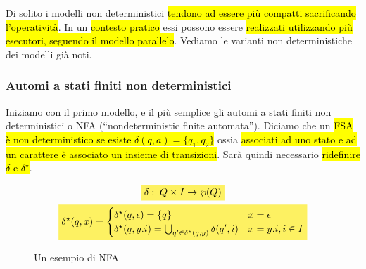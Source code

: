 \documentclass[a4paper,11pt,oneside]{article}
\theoremstyle{plain}
\theoremstyle{definition}
\theoremstyle{remark}
\newcommand{\mhl}[1]{\colorbox{hlcolor}{$\displaystyle #1$}}
\begin{document}
Di solito i modelli non deterministici \hl{tendono ad essere più compatti
sacrificando l'operatività}. In un \hl{contesto pratico} essi possono essere
\hl{realizzati utilizzando più esecutori, seguendo il modello parallelo}.
Vediamo le varianti non deterministiche dei modelli già noti.

\subsubsection{Automi a stati finiti non deterministici}\label{sec:nfa}

Iniziamo con il primo modello, e il più semplice gli automi a stati finiti non
deterministici o NFA (``nondeterministic finite automata''). Diciamo che un
\hl{FSA è non deterministico se esiste $\delta(q, a) = \{q_1, q_2\}$} ossia
\hl{associati ad uno stato e ad un carattere è associato un insieme di
transizioni}. Sarà quindi necessario \hl{ridefinire $\delta$ e $\delta^\star$}.

\begin{gather}
  \mhl{ \delta: \; Q \times I \to \wp(Q) } \\
  \mhl{
    \delta^\star(q,x) =
    \begin{cases}
      \delta^\star(q, \epsilon) = \{q\} & x = \epsilon \\
      \delta^\star(q, y.i) = \bigcup_{q' \in \delta^\star(q, y)} \delta(q', i) &
        x=y.i, i \in I
    \end{cases}
  }
\end{gather}

\begin{figure}[htb]
  \centering
  \caption{Un esempio di NFA}\label{fig:nfa}
\end{figure}
\end{document}

